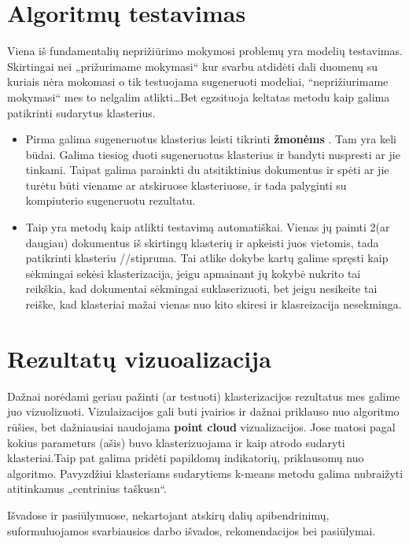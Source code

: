 \documentclass{VUMIFInfKursinis}
\begin{document}
\section{Algoritmų testavimas}
Viena iš fundamentalių neprižiūrimo mokymosi problemų yra modelių testavimas. Skirtingai nei „prižurimame mokymasi“ kur svarbu atdidėti dali duomenų su kuriais nėra mokomasi o tik testuojama sugeneruoti modeliai, “neprižiurimame mokymasi“ mes to nelgalim atlikti\ldots Bet egzsituoja keltatas metodu kaip galima patikrinti sudarytus klasterius.
\begin{itemize}
	\item Pirma galima sugeneruotus klasterius leisti tikrinti \textbf{žmonėms }. Tam yra keli būdai. Galima tiesiog duoti sugeneruotus klasterius ir bandyti nuspresti ar jie tinkami. Taipat galima parainkti du atsitiktinius dokumentus ir spėti ar jie turėtu būti viename ar atskiruose klasteriuose, ir tada palyginti su kompiuterio sugeneruotu rezultatu. 
	\item Taip yra metodų kaip atlikti testavimą automatiškai. Vienas jų paimti 2(ar daugiau) dokumentus iš skirtingų klasterių ir apkeisti juos vietomis, tada patikrinti klasteriu //stipruma. Tai atlike dokybe kartų galime spręsti kaip sėkmingai sekėsi klasterizacija, jeigu apmainant jų kokybė nukrito tai reikškia, kad dokumentai sėkmingai suklaserizuoti, bet jeigu nesikeite tai reiške, kad klasteriai mažai vienas nuo kito skiresi ir klasreizacija nesekminga.
\end{itemize}

\section{Rezultatų vizuoalizacija}
Dažnai norėdami geriau pažinti (ar testuoti) klasterizacijos rezultatus mes galime juo vizuolizuoti. Vizulaizacijos gali buti įvairios ir dažnai priklauso nuo algoritmo rūšies, bet dažniausiai naudojama \textbf{point cloud} vizualizacijos. Jose matosi pagal kokius parameturs (ašis) buvo klasterizuojama ir kaip atrodo sudaryti klasteriai.Taip pat galima pridėti papildomų indikatorių, priklausomų nuo algoritmo. Pavyzdžiui klasteriams sudarytiems k-means metodu galima nubraižyti atitinkamus „centrinius taškusn“.

Išvadose ir pasiūlymuose, nekartojant atskirų dalių apibendrinimų,
suformuluojamos svarbiausios darbo išvados, rekomendacijos bei pasiūlymai.

\printbibliography[heading=bibintoc] %

\appendix  %
\end{document}
